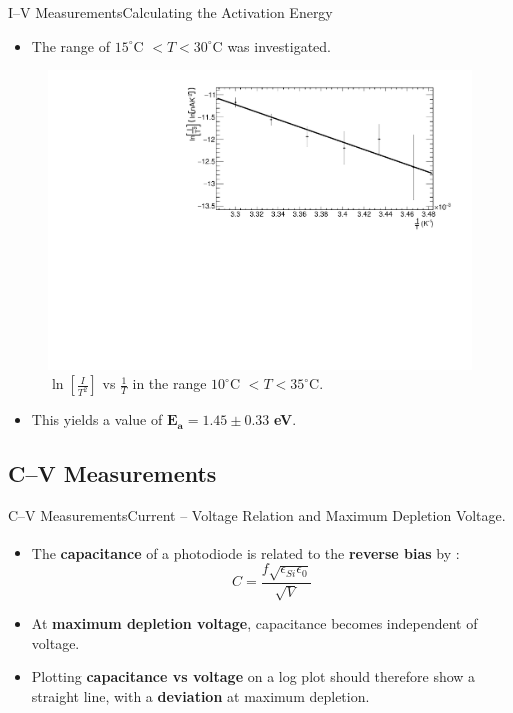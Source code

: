 \documentclass{beamer}
\begin{document}
    \begin{frame}{I--V Measurements}{Calculating the Activation Energy}
        \begin{itemize}
            \item The range of $15^{\circ}$C $<T<30^{\circ}$C was investigated.%
        \end{itemize}
        \vspace{-0.5cm}
        \begin{figure}
            \centering
            \includegraphics[width = 0.75\linewidth]{BandGap_0503.pdf}
            \caption{$\ln \left[{\frac{I}{T^2}}\right]$ vs $\frac{1}{T}$ in the range $10^{\circ}$C $<T<35^{\circ}$C.}
            \label{fig:my_label}
        \end{figure}
        \vspace{-0.5cm}
        \begin{itemize}
        \item This yields a value of $\bm{E_a = 1.45 \pm 0.33}$ \textbf{eV}.
        \end{itemize}
    \end{frame}
    
\subsection{C--V Measurements}
    
    \begin{frame}{C--V Measurements}{Current -- Voltage Relation and Maximum Depletion Voltage.}
        \begin{itemize}
            \item The \textbf{capacitance} of a photodiode is related to the \textbf{reverse bias} by \textsuperscript{\cite{Casse}}:
                \begin{equation*}
                    C = \frac{f\sqrt{\epsilon_{Si}\epsilon_0}}{\sqrt{V}}
                \end{equation*}
            \item At \textbf{maximum depletion voltage}, capacitance becomes independent of voltage.
            \vspace{0.5cm}
            \item Plotting \textbf{capacitance vs voltage} on a log plot should therefore show a straight line, with a \textbf{deviation} at maximum depletion.
        \end{itemize}
    \end{frame}
    
\end{document}
